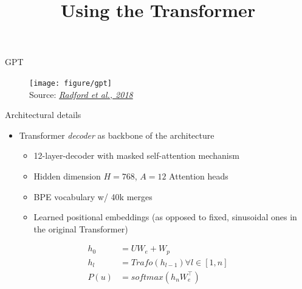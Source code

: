 



\newcommand{\titlefigure}{figure/gpt_sq.png}
\newcommand{\learninggoals}{
\item Understand the use of the transformer decoder in this model
\item Understand the input modifications and how this is useful}

\title{Using the Transformer}
\date{}




\begin{vbframe}{GPT \href{https://openai.com/blog/language-unsupervised/}{}}

\vfill

	\begin{figure}
		\centering
		\texttt{[image: figure/gpt]}\\ 
		\footnotesize{Source:} \href{https://s3-us-west-2.amazonaws.com/openai-assets/research-covers/language-unsupervised/language_understanding_paper.pdf}{\footnotesize \it Radford et al., 2018}
	\end{figure}

\vfill

\end{vbframe}


\begin{vbframe}{Architectural details}

\vfill

	\begin{itemize}
		\item Transformer \textit{decoder} as backbone of the architecture
			\begin{itemize}
				\item 12-layer-decoder with masked self-attention mechanism
				\item Hidden dimension $H = 768$, $A = 12$ Attention heads
				\item BPE vocabulary w/ 40k merges
				\item Learned positional embeddings (as opposed to fixed, sinusoidal ones in the original Transformer)
			\end{itemize}
	\end{itemize}

\begin{align*}
	h_0 &= U W_e + W_p \\
	h_l &= Trafo(h_{l-1}) \forall l \in [1,n]\\
	P(u) &= softmax(h_n W_e^\top)
\end{align*}

\vfill

\end{vbframe}

